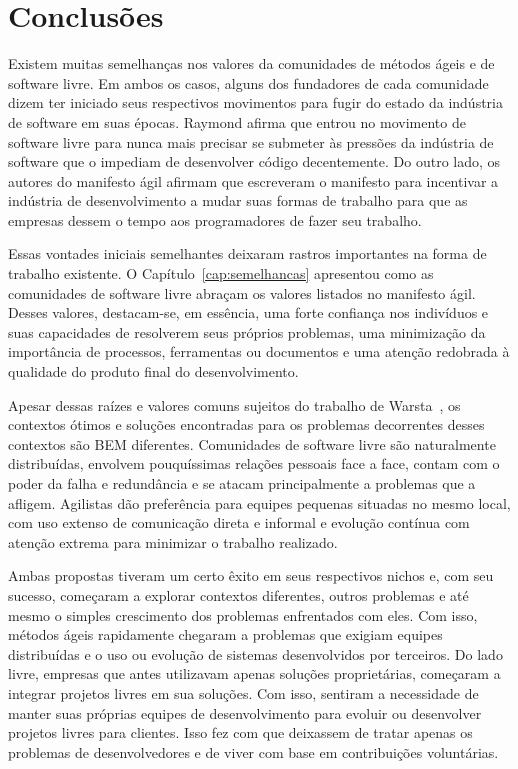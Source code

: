 \chapter{Conclusões}
\label{cap:conclusoes}

Existem muitas semelhanças nos valores da comunidades de métodos ágeis
e de software livre. Em ambos os casos, alguns dos fundadores de cada
comunidade dizem ter iniciado seus respectivos movimentos para fugir
do estado da indústria de software em suas épocas. Raymond afirma que
entrou no movimento de software livre para nunca mais precisar se
submeter às pressões da indústria de software que o impediam de
desenvolver código decentemente. Do outro lado, os autores do
manifesto ágil afirmam que escreveram o manifesto para incentivar a
indústria de desenvolvimento a mudar suas formas de trabalho para que
as empresas dessem o tempo aos programadores de fazer seu trabalho.

Essas vontades iniciais semelhantes deixaram rastros importantes na
forma de trabalho existente. O Capítulo~\ref{cap:semelhancas}
apresentou como as comunidades de software livre abraçam os valores
listados no manifesto ágil. Desses valores, destacam-se, em essência,
uma forte confiança nos indivíduos e suas capacidades de resolverem
seus próprios problemas, uma minimização da importância de processos,
ferramentas ou documentos e uma atenção redobrada à qualidade do
produto final do desenvolvimento.

Apesar dessas raízes e valores comuns sujeitos do trabalho de
Warsta~\cite{Warsta2002}, os contextos ótimos e soluções encontradas
para os problemas decorrentes desses contextos são BEM
diferentes. Comunidades de software livre são naturalmente
distribuídas, envolvem pouquíssimas relações pessoais face a face,
contam com o poder da falha e redundância e se atacam principalmente a
problemas que a afligem. Agilistas dão preferência para equipes
pequenas situadas no mesmo local, com uso extenso de comunicação
direta e informal e evolução contínua com atenção extrema para
minimizar o trabalho realizado.

Ambas propostas tiveram um certo êxito em seus respectivos nichos e,
com seu sucesso, começaram a explorar contextos diferentes, outros
problemas e até mesmo o simples crescimento dos problemas enfrentados
com eles. Com isso, métodos ágeis rapidamente chegaram a problemas que
exigiam equipes distribuídas e o uso ou evolução de sistemas
desenvolvidos por terceiros. Do lado livre, empresas que antes
utilizavam apenas soluções proprietárias, começaram a integrar
projetos livres em sua soluções. Com isso, sentiram a necessidade de
manter suas próprias equipes de desenvolvimento para evoluir ou
desenvolver projetos livres para clientes. Isso fez com que deixassem
de tratar apenas os problemas de desenvolvedores e de viver com base
em contribuições voluntárias.

